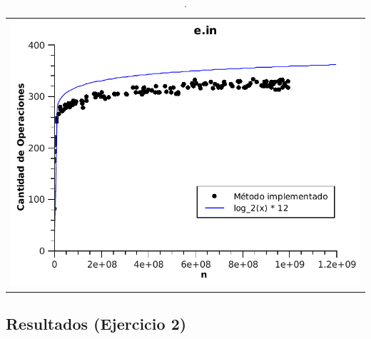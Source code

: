 	\begin{table}[ht]
		\centering 
			\begin{tabular}{c}
				\includegraphics[scale = 0.8]{./../ej1/tests/e.pdf}
			\end{tabular}
			\caption{.}
			\label{grafico4} 
	\end{table}
	

\newpage
\newpage
\newpage
\subsection{Resultados (Ejercicio 2)}
\label{resultadosej2}


